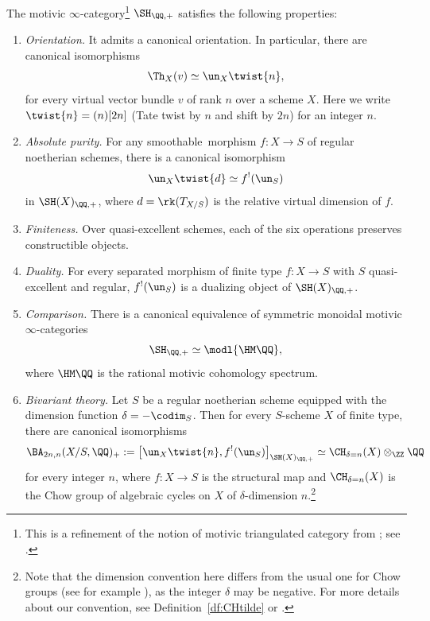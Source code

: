 \begin{thmi}\label{thm:intro_SHQ+}
The motivic $\infty$-category\footnote{This is a refinement of the notion of motivic triangulated category from \cite{CD3}; see \cite{KhanThesis,KhanSix}.} $\SH_{\QQ,+}$ satisfies the following properties:

\begin{enumerate}\renewcommand{\theenumi}{\Roman{enumi}}
\item\emph{Orientation.}\label{item:intro_SHQ+/orientation}
It admits a canonical orientation.
In particular, there are canonical isomorphisms
\[
\Th_X(v) \simeq \un_X\twist{n},
\]
for every virtual vector bundle $v$ of rank $n$ over a scheme $X$.
Here we write $\twist{n} = (n)[2n]$ (Tate twist by $n$ and shift by $2n$) for an integer $n$.
\item\emph{Absolute purity.}
For any smoothable\footnotemark~morphism $f : X \to S$ of regular noetherian schemes, there is a canonical isomorphism
\[ \un_{X}\twist{d} \simeq f^!(\un_{S}) \]
in $\SH(X)_{\QQ,+}$, where $d = \rk(T_{X/S})$ is the relative virtual dimension of $f$.
\item\emph{Finiteness.}
Over quasi-excellent schemes, each of the six operations preserves constructible objects.
\item\emph{Duality.}
For every separated morphism of finite type $f : X \to S$ with $S$ quasi-excellent and regular, $f^!(\un_{S})$ is a dualizing object of $\SH(X)_{\QQ,+}$.
\item\emph{Comparison.}\label{item:intro_SHQ+/comparison}
There is a canonical equivalence of symmetric monoidal motivic $\infty$-categories
\[
\SH_{\QQ,+} \simeq \modl{\HM\QQ},
\]
where $\HM\QQ$ is the rational motivic cohomology spectrum.
\item\emph{Bivariant theory.}
Let $S$ be a regular noetherian scheme equipped with the dimension function $\delta=-\codim_S$.
Then for every $S$-scheme $X$ of finite type, there are canonical isomorphisms\vspace*{-3pt}
\[
\BA_{2n,n}(X/S, \QQ)_+
:= \big[ \un_X\twist{n}, f^!(\un_S) \big]_{\SH(X)_{\QQ,+}}
\simeq \CH_{\delta=n}(X) \otimes_\ZZ \QQ
\]
for every integer $n$, where $f : X \to S$ is the structural map and $\CH_{\delta=n}(X)$ is the Chow group of algebraic cycles on $X$ of $\delta$-dimension $n$.\footnote{Note that the dimension convention here differs from the usual one for Chow groups (see for example \cite{Ful}), as the integer $\delta$ may be negative. For more details about our convention, see Definition~\ref{df:CHtilde} or \cite[Ex.\,3.1.6]{BD1}.}
\end{enumerate}
\end{thmi}

